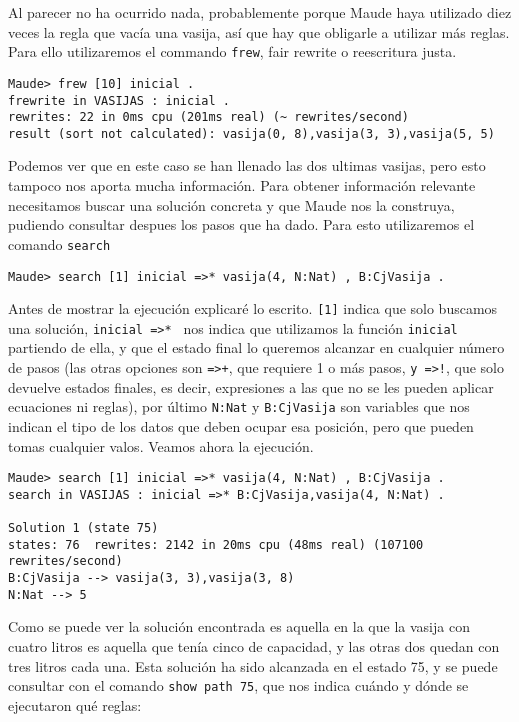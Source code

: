 Al parecer no ha ocurrido nada, probablemente porque Maude haya utilizado diez veces la regla que vacía una vasija, así que hay que obligarle a utilizar más reglas. Para ello utilizaremos el commando \texttt{frew}, fair rewrite o reescritura justa.\par

{\codesize
\begin{verbatim}
Maude> frew [10] inicial .
frewrite in VASIJAS : inicial .
rewrites: 22 in 0ms cpu (201ms real) (~ rewrites/second)
result (sort not calculated): vasija(0, 8),vasija(3, 3),vasija(5, 5)
\end{verbatim}
}

Podemos ver que en este caso se han llenado las dos ultimas vasijas, pero esto tampoco nos aporta mucha información. Para obtener información relevante necesitamos buscar una solución concreta y que Maude nos la construya, pudiendo consultar despues los pasos que ha dado. Para esto utilizaremos el comando \texttt{search}

{\codesize
\begin{verbatim}
Maude> search [1] inicial =>* vasija(4, N:Nat) , B:CjVasija .
\end{verbatim}
}

Antes de mostrar la ejecución explicaré lo escrito. \verb"[1]" indica que solo buscamos una solución, \verb"inicial =>* " nos indica que utilizamos la función \texttt{inicial} partiendo de ella, y que el estado final lo queremos alcanzar en cualquier número de pasos (las otras opciones son \verb"=>+", que requiere 1 o más pasos, \verb"y =>!", que solo devuelve estados finales, es decir, expresiones
a las que no se les pueden aplicar ecuaciones ni reglas), por último \verb"N:Nat" y \verb"B:CjVasija" son variables que nos indican el tipo de los datos que deben ocupar esa posición, pero que pueden tomas cualquier valos. Veamos ahora la ejecución.\par

{\codesize
\begin{verbatim}
Maude> search [1] inicial =>* vasija(4, N:Nat) , B:CjVasija .
search in VASIJAS : inicial =>* B:CjVasija,vasija(4, N:Nat) .

Solution 1 (state 75)
states: 76  rewrites: 2142 in 20ms cpu (48ms real) (107100 rewrites/second)
B:CjVasija --> vasija(3, 3),vasija(3, 8)
N:Nat --> 5
\end{verbatim}
}

Como se puede ver la solución encontrada es aquella en la que la vasija con cuatro litros es aquella que tenía cinco de capacidad, y las otras dos quedan con tres litros cada una. Esta solución ha sido alcanzada en el estado 75, y se puede consultar con el comando \verb"show path 75", que nos indica cuándo y dónde se ejecutaron qué reglas: \par

